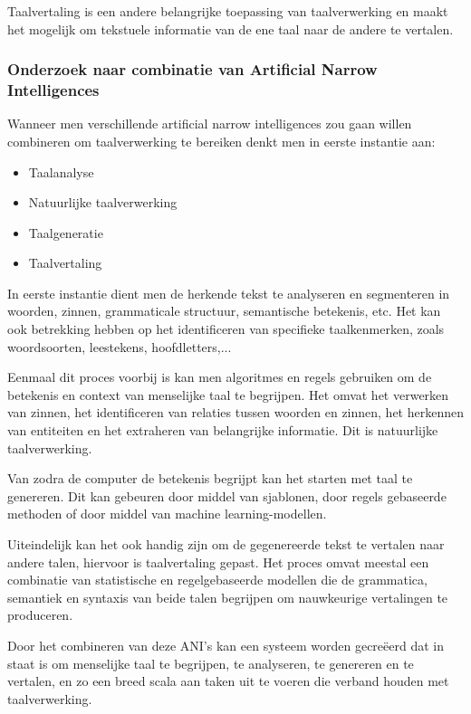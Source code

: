 Taalvertaling is een andere belangrijke toepassing van taalverwerking en maakt het mogelijk om tekstuele informatie van de ene taal naar de andere te vertalen.

\subsubsection{Onderzoek naar combinatie van Artificial Narrow Intelligences}

Wanneer men verschillende artificial narrow intelligences zou gaan willen combineren om taalverwerking te bereiken denkt men in eerste instantie aan:

\begin{itemize}
    \item Taalanalyse
    \item Natuurlijke taalverwerking
    \item Taalgeneratie
    \item Taalvertaling
\end{itemize}

In eerste instantie dient men de herkende tekst te analyseren en segmenteren in woorden, zinnen, grammaticale structuur, semantische betekenis, etc. Het kan ook betrekking hebben op het identificeren van specifieke taalkenmerken, zoals woordsoorten, leestekens, hoofdletters,...

Eenmaal dit proces voorbij is kan men algoritmes en regels gebruiken om de betekenis en context van menselijke taal te begrijpen. Het omvat het verwerken van zinnen, het identificeren van relaties tussen woorden en zinnen, het herkennen van entiteiten en het extraheren van belangrijke informatie. Dit is natuurlijke taalverwerking.

Van zodra de computer de betekenis begrijpt kan het starten met taal te genereren. Dit kan gebeuren door middel van sjablonen, door regels gebaseerde methoden of door middel van machine learning-modellen.

Uiteindelijk kan het ook handig zijn om de gegenereerde tekst te vertalen naar andere talen, hiervoor is taalvertaling gepast. Het proces omvat meestal een combinatie van statistische en regelgebaseerde modellen die de grammatica, semantiek en syntaxis van beide talen begrijpen om nauwkeurige vertalingen te produceren.

Door het combineren van deze ANI's kan een systeem worden gecreëerd dat in staat is om menselijke taal te begrijpen, te analyseren, te genereren en te vertalen, en zo een breed scala aan taken uit te voeren die verband houden met taalverwerking.

